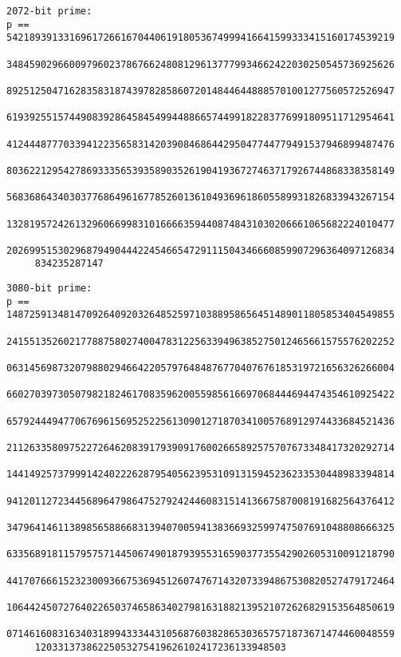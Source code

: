 \documentclass[]{article}
\begin{document}
\begin{small}
\begin{verbatim}
2072-bit prime:
p == 54218939133169617266167044061918053674999416641599333415160174539219
     34845902966009796023786766248081296137779934662422030250545736925626
     89251250471628358318743978285860720148446448885701001277560572526947
     61939255157449083928645845499448866574499182283776991809511712954641
     41244487770339412235658314203908468644295047744779491537946899487476
     80362212954278693335653935890352619041936727463717926744868338358149
     56836864340303776864961677852601361049369618605589931826833943267154
     13281957242613296066998310166663594408748431030206661065682224010477
     20269951530296879490444224546654729111504346660859907296364097126834
     834235287147
\end{verbatim}
\newpage
\begin{verbatim}
3080-bit prime:
p == 14872591348147092640920326485259710388958656451489011805853404549855
     24155135260217788758027400478312256339496385275012465661575576202252
     06314569873207988029466422057976484876770407676185319721656326266004
     66027039730507982182461708359620055985616697068444694474354610925422
     65792444947706769615695252256130901271870341005768912974433684521436
     21126335809752272646208391793909176002665892575707673348417320292714
     14414925737999142402226287954056239531091315945236233530448983394814
     94120112723445689647986475279242446083151413667587008191682564376412
     34796414611389856588668313940700594138366932599747507691048808666325
     63356891811579575714450674901879395531659037735542902605310091218790
     44170766615232300936675369451260747671432073394867530820527479172464
     10644245072764022650374658634027981631882139521072626829153564850619
     07146160831634031899433344310568760382865303657571873671474460048559
     12033137386225053275419626102417236133948503


\end{verbatim}
\end{small}
\end{document}

